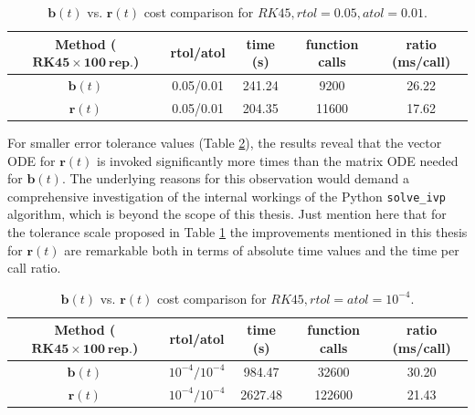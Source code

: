 \begin{table}[ht]
            \bigskip
		\centering %
		\begin{tabular}{c c c c c} %
			\hline\hline %
			\textbf{Method ($\mathbf{RK45\times 100~rep.}$)} & \textbf{rtol/atol} & \textbf{time (s)} & \textbf{function calls} & \textbf{ratio (ms/call)} \\ [0.1ex] %
			\hline\hline 
			$\mathbf{b}(t)$ & 0.05/0.01 & 241.24 & 9200 & 26.22 \\ %
			$\mathbf{r}(t)$ & 0.05/0.01 & 204.35 & 11600 & 17.62 \\ [0.5ex] %
			\hline %
		\end{tabular}
		\caption{$\mathbf{b}(t)$ vs. $\mathbf{r}(t)$ cost comparison for $RK45, rtol=0.05, atol=0.01$.} 
       \label{table:btrt} 
\end{table}

\newpage

For smaller error tolerance values (Table \ref{table:btrt2}), the results reveal that the vector ODE for $\mathbf{r}(t)$ is invoked significantly more times than the matrix ODE needed for $\mathbf{b}(t)$. The underlying reasons for this observation would demand a comprehensive investigation of the internal workings of the Python \texttt{solve\_ivp} algorithm, which is beyond the scope of this thesis. Just mention here that for the tolerance scale proposed in Table \ref{table:btrt} the improvements mentioned in this thesis for $\mathbf{r}(t)$ are remarkable both in terms of absolute time values and the time per call ratio.

\begin{table}[ht]
            \bigskip
		\centering %
		\begin{tabular}{c c c c c} %
			\hline\hline %
			\textbf{Method ($\mathbf{RK45\times 100~rep.}$)} & \textbf{rtol/atol} & \textbf{time (s)} & \textbf{function calls} & \textbf{ratio (ms/call)} \\ [0.1ex] %
			\hline\hline 
			$\mathbf{b}(t)$ & $10^{-4}/10^{-4}$ & 984.47 & 32600 & 30.20 \\ %
			$\mathbf{r}(t)$ & $10^{-4}/10^{-4}$ & 2627.48 & 122600 & 21.43 \\ [0.5ex] %
			\hline %
		\end{tabular}
		\caption{$\mathbf{b}(t)$ vs. $\mathbf{r}(t)$ cost comparison for $RK45, rtol=atol=10^{-4}$.} 
       \label{table:btrt2} 
\end{table}

